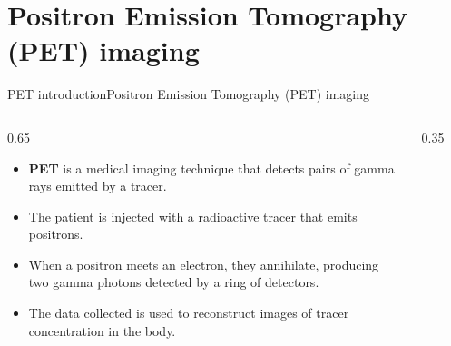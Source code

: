 \documentclass{beamer}
\numberwithin{proposition}{section}
\begin{document}
\section{Positron Emission Tomography (PET) imaging}

\begin{frame}
\end{frame}

\begin{frame}{PET introduction}{Positron Emission Tomography (PET) imaging}
    \begin{columns}
        \begin{column}{0.65\textwidth}
            \begin{itemize}
                \item \textbf{PET} is a medical imaging technique that detects pairs of gamma rays emitted by a tracer.
                \item The patient is injected with a radioactive tracer that emits positrons.
                \item When a positron meets an electron, they annihilate, producing two gamma photons detected by a ring of detectors.
                \item The data collected is used to reconstruct images of tracer concentration in the body.
            \end{itemize}
        \end{column}
        \begin{column}{0.35\textwidth}
            \centering
             \begin{figure}
\end{figure}
\end{column}
\end{columns}
\end{frame}
\end{document}

